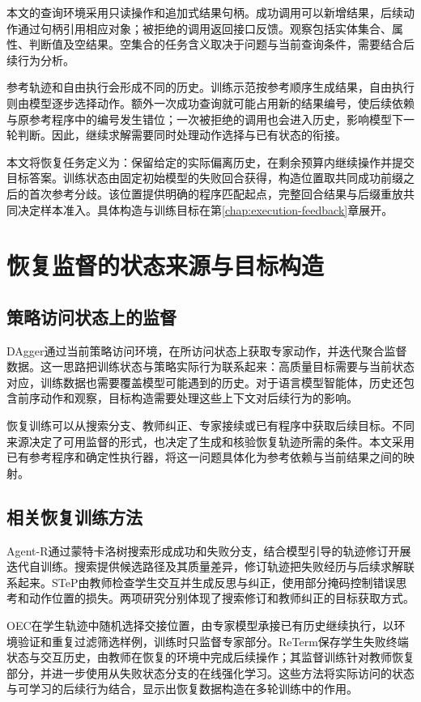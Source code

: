 本文的查询环境采用只读操作和追加式结果句柄。成功调用可以新增结果，后续动作通过句柄引用相应对象；被拒绝的调用返回接口反馈。观察包括实体集合、属性、判断值及空结果。空集合的任务含义取决于问题与当前查询条件，需要结合后续行为分析。

参考轨迹和自由执行会形成不同的历史。训练示范按参考顺序生成结果，自由执行则由模型逐步选择动作。额外一次成功查询就可能占用新的结果编号，使后续依赖与原参考程序中的编号发生错位；一次被拒绝的调用也会进入历史，影响模型下一轮判断。因此，继续求解需要同时处理动作选择与已有状态的衔接。

本文将恢复任务定义为：保留给定的实际偏离历史，在剩余预算内继续操作并提交目标答案。训练状态由固定初始模型的失败回合获得，构造位置取共同成功前缀之后的首次参考分歧。该位置提供明确的程序匹配起点，完整回合结果与后缀重放共同决定样本准入。具体构造与训练目标在第\ref{chap:execution-feedback}章展开。

\section{恢复监督的状态来源与目标构造}

\subsection{策略访问状态上的监督}

DAgger通过当前策略访问环境，在所访问状态上获取专家动作，并迭代聚合监督数据\cite{ross2011dagger}。这一思路把训练状态与策略实际行为联系起来：高质量目标需要与当前状态对应，训练数据也需要覆盖模型可能遇到的历史。对于语言模型智能体，历史还包含前序动作和观察，目标构造需要处理这些上下文对后续行为的影响。

恢复训练可以从搜索分支、教师纠正、专家接续或已有程序中获取后续目标。不同来源决定了可用监督的形式，也决定了生成和核验恢复轨迹所需的条件。本文采用已有参考程序和确定性执行器，将这一问题具体化为参考依赖与当前结果之间的映射。

\subsection{相关恢复训练方法}

Agent-R通过蒙特卡洛树搜索形成成功和失败分支，结合模型引导的轨迹修订开展迭代自训练\cite{yuan2025agentr}。搜索提供候选路径及其质量差异，修订轨迹把失败经历与后续求解联系起来。STeP由教师检查学生交互并生成反思与纠正，使用部分掩码控制错误思考和动作位置的损失\cite{chen2025step}。两项研究分别体现了搜索修订和教师纠正的目标获取方式。

OEC在学生轨迹中随机选择交接位置，由专家模型承接已有历史继续执行，以环境验证和重复过滤筛选样例，训练时只监督专家部分\cite{lauffer2025oec}。ReTerm保存学生失败终端状态与交互历史，由教师在恢复的环境中完成后续操作；其监督训练针对教师恢复部分，并进一步使用从失败状态分支的在线强化学习\cite{xie2026reterm}。这些方法将实际访问的状态与可学习的后续行为结合，显示出恢复数据构造在多轮训练中的作用。

